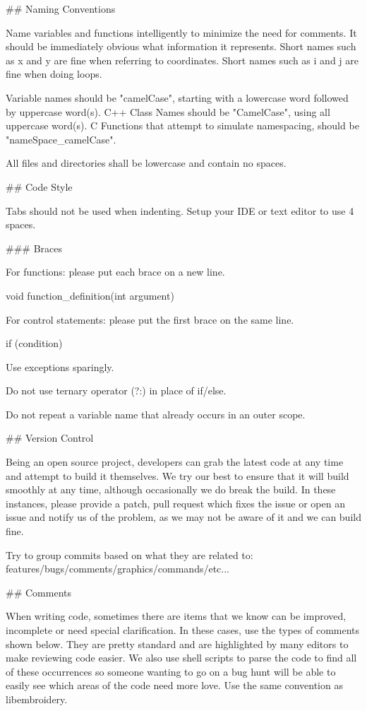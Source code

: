 \documentclass[a4paper, 11pt]{report}
\begin{document}
##  Naming Conventions

Name variables and functions intelligently to minimize the need for comments.
It should be immediately obvious what information it represents.
Short names such as x and y are fine when referring to coordinates.
Short names such as i and j are fine when doing loops.

Variable names should be "camelCase", starting with a lowercase word followed by uppercase word(s).
C++ Class Names should be "CamelCase", using all uppercase word(s).
C Functions that attempt to simulate namespacing, should be "nameSpace_camelCase".

All files and directories shall be lowercase and contain no spaces.

## Code Style

Tabs should not be used when indenting. Setup your IDE or text editor to use 4 spaces.

### Braces

For functions: please put each brace on a new line.

    void function_definition(int argument)
    {
    
    }

For control statements: please put the first brace on the same line.

    if (condition) {
    
    }

Use exceptions sparingly.

Do not use ternary operator (?:) in place of if/else.

Do not repeat a variable name that already occurs in an outer scope.

## Version Control 

Being an open source project, developers can grab the latest code at any time
and attempt to build it themselves. We try our best to ensure that it will build smoothly
at any time, although occasionally we do break the build. In these instances,
please provide a patch, pull request which fixes the issue or open an issue and
notify us of the problem, as we may not be aware of it and we can build fine.

Try to group commits based on what they are related to: features/bugs/comments/graphics/commands/etc...

## Comments

When writing code, sometimes there are items that we know can be improved,
incomplete or need special clarification. In these cases, use the types of
comments shown below. They are pretty standard and are highlighted by many editors to
make reviewing code easier. We also use shell scripts to parse the code to find
all of these occurrences so someone wanting to go on a bug hunt will be able to
easily see which areas of the code need more love. Use the same convention
as libembroidery.
\end{document}
